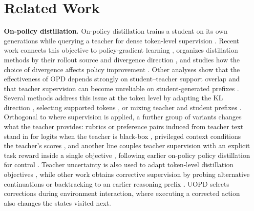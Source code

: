 \section{Related Work}
\label{sec:related}

\textbf{On-policy distillation.}
On-policy distillation trains a student on its own generations while querying a teacher for dense token-level supervision \citep{agarwal2024policy}. Recent work connects this objective to policy-gradient learning \citep{vopd2026,exopd2026}, organizes distillation methods by their rollout source and divergence direction \citep{decoupled2026}, and studies how the choice of divergence affects policy improvement \citep{distil2026}. Other analyses show that the effectiveness of OPD depends strongly on student--teacher support overlap and that teacher supervision can become unreliable on student-generated prefixes \citep{manyfaces2026,rethinking2026}. Several methods address this issue at the token level by adapting the KL direction \citep{aopd2026,hpd2026}, selecting supported tokens \citep{taopd2026}, or mixing teacher and student prefixes \citep{xu2025skd,brts2026}. Orthogonal to where supervision is applied, a further group of variants changes what the teacher provides: rubrics or preference pairs induced from teacher text stand in for logits when the teacher is black-box \citep{ropd2026,orpodistill2025}, privileged context conditions the teacher's scores \citep{mopd2026}, and another line couples teacher supervision with an explicit task reward inside a single objective \citep{kdrl2025,rlad2026,sparse2dense2026,chord2026}, following earlier on-policy policy distillation for control \citep{ppd2025}. Teacher uncertainty is also used to adapt token-level distillation objectives \citep{eopd2026,egrsd2026}, while other work obtains corrective supervision by probing alternative continuations or backtracking to an earlier reasoning prefix \citep{spot2026,motab2026}. UOPD selects corrections during environment interaction, where executing a corrected action also changes the states visited next.

